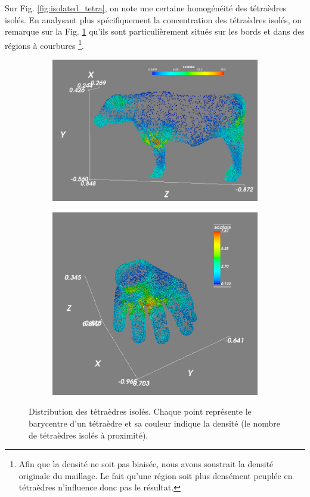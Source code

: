 \noindent
Sur Fig. \ref{fig:isolated_tetra}, on note une certaine homogénéité des tétraèdres isolés. En analysant plus spécifiquement la concentration des tétraèdres isolés, on remarque sur la Fig. \ref{fig:density_cow_hand} qu'ils sont particulièrement situés sur les bords et dans des régions à courbures \footnote{Afin que la densité ne soit pas biaisée, nous avons soustrait la densité originale du maillage. Le fait qu'une région soit plus densément peuplée en tétraèdres n'influence donc pas le résultat.}.
\begin{figure}[H]
\centering
\begin{subfigure}{.5\textwidth}
  \centering
  \includegraphics[scale=0.25]{../Images/density_cow}
\end{subfigure}%
\begin{subfigure}{.5\textwidth}
  \centering
  \includegraphics[scale=0.22]{../Images/hand_density}
\end{subfigure}
\caption{Distribution des tétraèdres isolés. Chaque point représente le barycentre d'un tétraèdre et sa couleur indique la densité (le nombre de tétraèdres isolés à proximité).}
\label{fig:density_cow_hand}
\end{figure}

